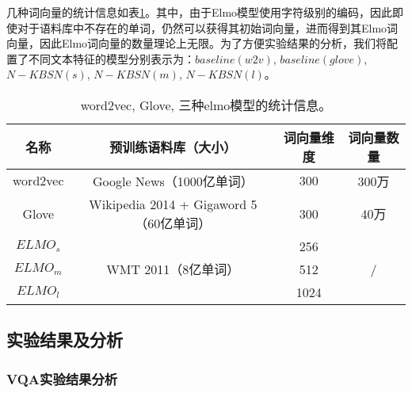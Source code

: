 几种词向量的统计信息如表\ref{embedding_compare}。其中，由于Elmo模型使用字符级别的编码，因此即使对于语料库中不存在的单词，仍然可以获得其初始词向量，进而得到其Elmo词向量，因此Elmo词向量的数量理论上无限。为了方便实验结果的分析，我们将配置了不同文本特征的模型分别表示为：$baseline(w2v)$, $baseline(glove)$, $N-KBSN(s)$, $N-KBSN(m)$, $N-KBSN(l)$。
\begin{table}[H]
\centering
\caption{word2vec, Glove, 三种elmo模型的统计信息。}
\begin{tabular}{c|c|c|c}
\toprule
\textbf{名称} & \textbf{预训练语料库（大小）} & \textbf{词向量维度} & \textbf{词向量数量} \\
\midrule
word2vec&  Google News（1000亿单词）& 300&  300万\\
Glove&  Wikipedia 2014 + Gigaword 5（60亿单词）& 300&  40万\\
\midrule
$ELMO_s$&  \multirow{3}{*}{WMT 2011（8亿单词）}& 256& \multirow{3}{*}{/}\\
$ELMO_m$&  & 512&  \\
$ELMO_l$&  & 1024&  \\
\bottomrule
\end{tabular}
\label{embedding_compare}
\end{table}

\subsection{实验结果及分析}

\subsubsection{VQA实验结果分析}

